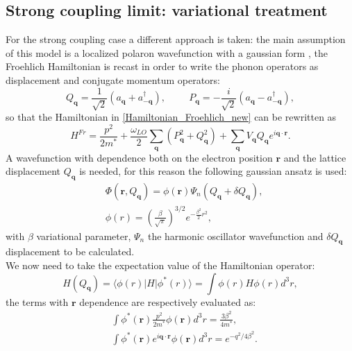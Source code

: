 \subsection{Strong coupling limit: variational treatment}
For the strong coupling case a different approach is taken: the main assumption of this model is a localized polaron wavefunction with 
a gaussian form \cite{mahan2013many}, the Froehlich Hamiltonian is recast in order to write the phonon operators as displacement and 
conjugate momentum operators:
\begin{equation}
    Q_\mathbf{q}=\frac{1}{\sqrt{2}}\left(a_\mathbf{q}+a^\dagger_{-\mathbf{q}}\right),\hspace{1cm}P_\mathbf{q}=-\frac{i}{\sqrt{2}}\left(a_\mathbf{q}-a^\dagger_{-\mathbf{q}}\right),
\end{equation}
so that the Hamiltonian in \ref{Hamiltonian_Froehlich_new} can be rewritten as
\begin{equation}
    H^{Fr}=\frac{p^2}{2m^*}+\frac{\omega_{LO}}{2}\sum_{\mathbf{q}}\left(P^2_\mathbf{q}+Q^2_\mathbf{q}\right)+\sum_\mathbf{q}V_\mathbf{q}Q_\mathbf{q}e^{i\mathbf{q}\cdot\mathbf{r}}.
\end{equation}
A wavefunction with dependence both on the electron position $\mathbf{r}$ and the lattice displacement $Q_\mathbf{q}$ is needed, for 
this reason the following gaussian ansatz is used:
\begin{equation}
\begin{split}
    &\Phi(\mathbf{r},Q_\mathbf{q})=\phi(\mathbf{r})\Psi_n(Q_\mathbf{q}+\delta Q_\mathbf{q}),\\
    &\phi(r)=\left(\frac{\beta}{\sqrt{\pi}}\right)^{3/2}e^{-\frac{\beta^2}{2}r^2},
\end{split}
\end{equation}
with $\beta$ variational parameter, $\Psi_n$ the harmonic oscillator wavefunction and $\delta Q_\mathbf{q}$ displacement to be 
calculated.\\
We now need to take the expectation value of the Hamiltonian operator:
\begin{equation}
    H(Q_\mathbf{q})=\langle \phi(r)|H|\phi^*(r)\rangle=\int \phi(r)H\phi(r)d^3r,
\end{equation}
the terms with $\mathbf{r}$ dependence are respectively evaluated as:
\begin{equation}
\begin{split}
    &\int\phi^*(\mathbf{r})\frac{p^2}{2m^*}\phi(\mathbf{r})d^3r=\frac{3\beta^2}{4m^*},\\
    &\int \phi^*(\mathbf{r})e^{i\mathbf{q}\cdot\mathbf{r}}\phi(\mathbf{r})d^3r=e^{-q^2/4\beta^2}.
\end{split}
\end{equation}
